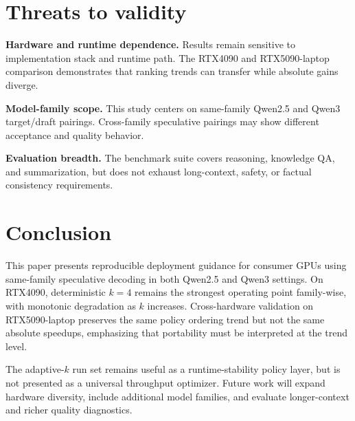 \section{Threats to validity}
\label{sec:threats}

\textbf{Hardware and runtime dependence.}
Results remain sensitive to implementation stack and runtime path.
The RTX4090 and RTX5090-laptop comparison demonstrates that ranking trends can
transfer while absolute gains diverge.

\textbf{Model-family scope.}
This study centers on same-family Qwen2.5 and Qwen3 target/draft pairings.
Cross-family speculative pairings may show different acceptance and quality
behavior.

\textbf{Evaluation breadth.}
The benchmark suite covers reasoning, knowledge QA, and summarization, but does
not exhaust long-context, safety, or factual consistency requirements.

\section{Conclusion}
\label{sec:conclusion}

This paper presents reproducible deployment guidance for
consumer GPUs using same-family speculative decoding in both Qwen2.5 and
Qwen3 settings. On RTX4090, deterministic $k{=}4$ remains the strongest
operating point family-wise, with monotonic degradation as $k$ increases.
Cross-hardware validation on RTX5090-laptop preserves the same policy ordering
trend but not the same absolute speedups, emphasizing that portability must be
interpreted at the trend level.

The adaptive-$k$ run set remains useful as a runtime-stability policy layer,
but is not presented as a universal throughput optimizer.
Future work will expand hardware diversity, include additional model families,
and evaluate longer-context and richer quality diagnostics.
